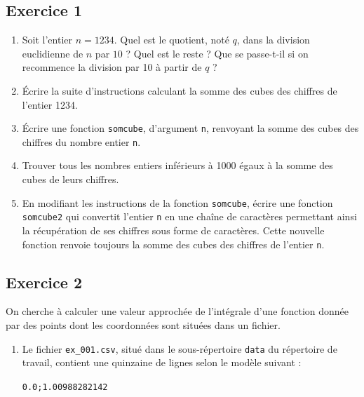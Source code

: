 \documentclass[10pt,fleqn]{article} %
\begin{document}


\def\columnseprulecolor{\color{ocre}}
\setlength{\columnseprule}{0.4pt} 

\begin{multicols}{2}
\subsection*{Exercice 1}
\begin{enumerate}
\item Soit l’entier $n = 1234$. Quel est le quotient, noté $q$, dans la division euclidienne de $n$ par $10$ ? Quel est
le reste ? Que se passe-t-il si on recommence la division par 10 à partir de $q$ ?
\item Écrire la suite d’instructions calculant la somme des cubes des chiffres de l’entier 1234.
\item Écrire une fonction \texttt{somcube}, d’argument \texttt{n}, renvoyant la somme des cubes des chiffres du nombre
entier \texttt{n}.
\item Trouver tous les nombres entiers inférieurs à 1000 égaux à la somme des cubes de leurs chiffres.
\item En modifiant les instructions de la fonction \texttt{somcube}, écrire une fonction \texttt{somcube2} qui convertit
l’entier \texttt{n} en une chaîne de caractères permettant ainsi la récupération de ses chiffres sous forme de
caractères. Cette nouvelle fonction renvoie toujours la somme des cubes des chiffres de l’entier \texttt{n}.
\end{enumerate}


\subsection*{Exercice 2}

On cherche à calculer une valeur approchée de l’intégrale d’une fonction donnée par des points dont les coordonnées sont situées dans un fichier.
\begin{enumerate}
\item Le fichier \texttt{ex\_001.csv}, situé dans le sous-répertoire \texttt{data} du répertoire de travail, contient une quinzaine de lignes selon le modèle suivant :

\begin{center}

\texttt{0.0;1.00988282142}


\end{center}
\end{enumerate}
\end{multicols}
\end{document}

